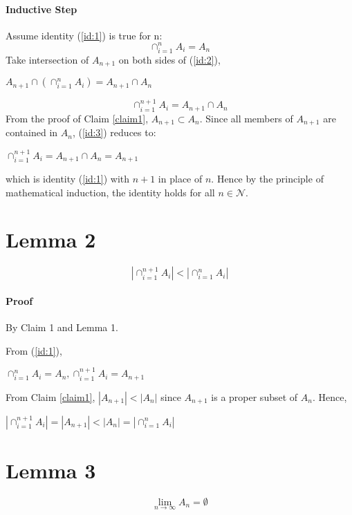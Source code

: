 \documentclass[14pt]{extarticle}
\begin{document}
	\paragraph{Inductive Step} Assume identity (\ref{id:1}) is true for n:
	\begin{equation}\label{id:2}
	\cap_{i=1}^n A_i= A_n
	\end{equation}
	Take intersection of $A_{n+1}$ on both sides of (\ref{id:2}),
	\begin{center}
	$A_{n+1} \cap (\cap_{i=1}^n A_i)= A_{n+1} \cap A_n$
	\end{center}
	\begin{equation}\label{id:3}
	\cap_{i=1}^{n+1} A_i = A_{n+1} \cap A_n
	\end{equation}
	From the proof of Claim \ref{claim1}, $A_{n+1} \subset A_n$.  Since all members of $A_{n+1}$ are contained in $A_n$, (\ref{id:3}) reduces to:
	\begin{center}
	$\cap_{i=1}^{n+1} A_i= A_{n+1} \cap A_n = A_{n+1}$	
	\end{center} 
	which is identity (\ref{id:1}) with $n+1$ in place of $n$.  Hence by the principle of mathematical induction, the identity holds for all $n \in \mathcal{N}$.
	\section{Lemma 2}
	\begin{equation}\label{lemma2}
	|\cap_{i=1}^{n+1} A_i| < |\cap_{i=1}^n A_i|
	\end{equation}
	\paragraph{Proof} By Claim 1 and Lemma 1.
	\par\bigskip
	From (\ref{id:1}),
	\begin{center}
		$\cap_{i=1}^n A_i = A_n, \cap_{i=1}^{n+1} A_i = A_{n+1}$	
	\end{center} 
	From Claim \ref{claim1}, $|A_{n+1}| < |A_n|$ since $A_{n+1}$ is a proper subset of $A_n$.  Hence,
	\begin{center}
	 $|\cap_{i=1}^{n+1} A_i| = |A_{n+1}| < |A_n| = |\cap_{i=1}^n A_i|$
\end{center} 
	\section{Lemma 3}
	\begin{equation}\label{lemma3}
	\lim\limits_{n \to \infty} A_n = \emptyset
	\end{equation}
\end{document}
